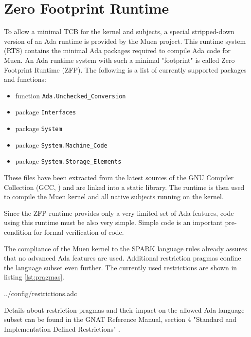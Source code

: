 \section{Zero Footprint Runtime}\label{sec:zfs-rts}
To allow a minimal TCB for the kernel and subjects, a special stripped-down
version of an Ada runtime is provided by the Muen project. This
runtime system (RTS) contains the minimal Ada packages required
to compile Ada code for Muen. An Ada runtime system with such a minimal
"footprint" is called Zero Footprint Runtime (ZFP). The following is
a list of currently supported packages and functions:

\begin{itemize}
	\item function \texttt{Ada.Unchecked\_Conversion}
	\item package \texttt{Interfaces}
	\item package \texttt{System}
	\item package \texttt{System.Machine\_Code}
	\item package \texttt{System.Storage\_Elements}
\end{itemize}

These files have been extracted from the latest sources of the GNU Compiler
Collection (GCC, \cite{gcc}) and are linked into a static library.
The runtime is then used to compile the Muen kernel and all native subjects
running on the kernel.

Since the ZFP runtime provides only a very limited set of Ada features, code
using this runtime must be also very simple. Simple code is an important
pre-condition for formal verification of code.

The compliance of the Muen kernel to the SPARK language rules
already assures that no advanced Ada features are used. Additional restriction
pragmas confine the language subset even further. The currently
used restrictions are shown in listing \ref{lst:pragmas}.


	{../config/restrictions.adc}

Details about restriction pragmas and their impact on the allowed Ada language
subset can be found in the GNAT Reference Manual, section 4 "Standard and
Implementation Defined Restrictions" \cite{GNAT:manual}.
